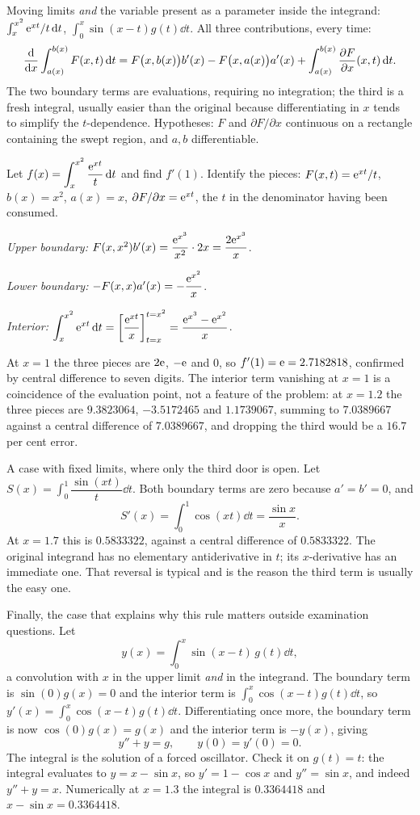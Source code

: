 \cue Moving limits \emph{and} the variable present as a parameter inside the integrand: $\int_{x}^{x^{2}}\mathrm{e}^{xt}/t\,\mathrm{d} t$, $\int_{0}^{x}\sin(x-t)g(t)\dd t$.
\method All three contributions, every time:
\[
\frac{\mathrm{d}}{\mathrm{d}x}\int_{a(x)}^{b(x)}F(x,t)\,\mathrm{d} t
=F\bigl(x,b(x)\bigr)b'(x)-F\bigl(x,a(x)\bigr)a'(x)+\int_{a(x)}^{b(x)}\frac{\partial F}{\partial x}(x,t)\,\mathrm{d} t .
\]
The two boundary terms are evaluations, requiring no integration; the third is a fresh integral, usually easier than the original because differentiating in $x$ tends to simplify the $t$-dependence. Hypotheses: $F$ and $\partial F/\partial x$ continuous on a rectangle containing the swept region, and $a,b$ differentiable.

\begin{worked}
Let $f(x)=\displaystyle\int_{x}^{x^{2}}\frac{\mathrm{e}^{xt}}{t}\,\mathrm{d} t$ and find $f'(1)$. Identify the pieces: $F(x,t)=\mathrm{e}^{xt}/t$, $b(x)=x^{2}$, $a(x)=x$, $\partial F/\partial x=\mathrm{e}^{xt}$, the $t$ in the denominator having been consumed.

\emph{Upper boundary:} $F(x,x^{2})b'(x)=\dfrac{\mathrm{e}^{x^{3}}}{x^{2}}\cdot2x=\dfrac{2\mathrm{e}^{x^{3}}}{x}$.

\emph{Lower boundary:} $-F(x,x)a'(x)=-\dfrac{\mathrm{e}^{x^{2}}}{x}$.

\emph{Interior:} $\displaystyle\int_{x}^{x^{2}}\mathrm{e}^{xt}\,\mathrm{d} t=\left[\frac{\mathrm{e}^{xt}}{x}\right]_{t=x}^{t=x^{2}}=\frac{\mathrm{e}^{x^{3}}-\mathrm{e}^{x^{2}}}{x}$.

At $x=1$ the three pieces are $2\mathrm{e}$, $-\mathrm{e}$ and $0$, so $f'(1)=\mathrm{e}=2.7182818$, confirmed by central difference to seven digits. The interior term vanishing at $x=1$ is a coincidence of the evaluation point, not a feature of the problem: at $x=1.2$ the three pieces are $9.3823064$, $-3.5172465$ and $1.1739067$, summing to $7.0389667$ against a central difference of $7.0389667$, and dropping the third would be a $16.7$ per cent error.

A case with fixed limits, where only the third door is open. Let $S(x)=\displaystyle\int_{0}^{1}\dfrac{\sin(xt)}{t}\dd t$. Both boundary terms are zero because $a'=b'=0$, and
\[
S'(x)=\int_{0}^{1}\cos(xt)\dd t=\frac{\sin x}{x}.
\]
At $x=1.7$ this is $0.5833322$, against a central difference of $0.5833322$. The original integrand has no elementary antiderivative in $t$; its $x$-derivative has an immediate one. That reversal is typical and is the reason the third term is usually the easy one.

Finally, the case that explains why this rule matters outside examination questions. Let
\[
y(x)=\int_{0}^{x}\sin(x-t)\,g(t)\dd t ,
\]
a convolution with $x$ in the upper limit \emph{and} in the integrand. The boundary term is $\sin(0)g(x)=0$ and the interior term is $\int_{0}^{x}\cos(x-t)g(t)\dd t$, so $y'(x)=\int_{0}^{x}\cos(x-t)g(t)\dd t$. Differentiating once more, the boundary term is now $\cos(0)g(x)=g(x)$ and the interior term is $-y(x)$, giving
\[
y''+y=g,\qquad y(0)=y'(0)=0 .
\]
The integral is the solution of a forced oscillator. Check it on $g(t)=t$: the integral evaluates to $y=x-\sin x$, so $y'=1-\cos x$ and $y''=\sin x$, and indeed $y''+y=x$. Numerically at $x=1.3$ the integral is $0.3364418$ and $x-\sin x=0.3364418$.
\end{worked}

